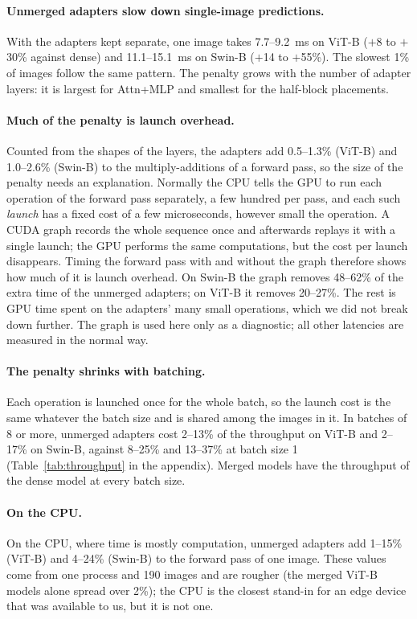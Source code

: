 \paragraph{Unmerged adapters slow down single-image predictions.} With the adapters kept separate, one image takes
7.7--9.2~ms on ViT-B ($+$8 to $+$30\% against dense) and 11.1--15.1~ms on Swin-B ($+$14 to $+$55\%). The slowest 1\%
of images follow the same pattern. The penalty grows with the number of adapter layers: it is largest for Attn+MLP
and smallest for the half-block placements.

\paragraph{Much of the penalty is launch overhead.} Counted from the shapes of the layers, the adapters add
0.5--1.3\% (ViT-B) and 1.0--2.6\% (Swin-B) to the multiply-additions of a forward pass, so the size of the penalty
needs an explanation. Normally the CPU tells the GPU to run each operation
of the forward pass separately, a few hundred per pass, and each such \emph{launch} has a fixed cost of a few
microseconds, however small the operation. A CUDA graph records the whole sequence once and afterwards replays it
with a single launch; the GPU performs the same computations, but the cost per launch disappears. Timing the
forward pass with and without the graph therefore shows how much of it is launch overhead. On Swin-B the graph
removes 48--62\% of the extra time of the unmerged adapters; on ViT-B it removes 20--27\%. The rest is GPU time
spent on the adapters' many small operations, which we did not break down further. The graph is used here only as a
diagnostic; all other latencies are measured in the normal way.

\paragraph{The penalty shrinks with batching.} Each operation is launched once for the whole batch, so the launch cost is the same
whatever the batch size and is shared among the images in it. In batches of 8 or more, unmerged adapters cost 2--13\% of the throughput
on ViT-B and 2--17\% on Swin-B, against 8--25\% and 13--37\% at batch size 1 (Table~\ref{tab:throughput} in the
appendix). Merged models have the throughput of the dense model at every batch size.

\paragraph{On the CPU.} On the CPU, where time is mostly computation, unmerged adapters add 1--15\% (ViT-B) and
4--24\% (Swin-B) to the forward pass of one image. These values come from one process and 190 images and are rougher (the merged ViT-B models alone spread over
2\%); the CPU is the closest stand-in for an edge device that was available to us, but it is not one.

